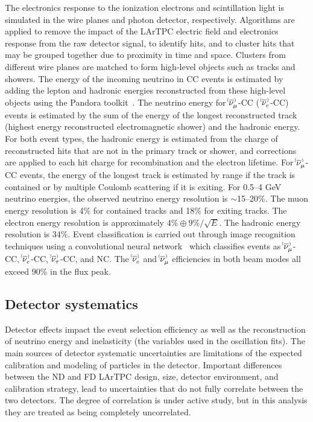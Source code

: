 The electronics response to the ionization electrons and scintillation light is simulated in the wire planes and photon detector, respectively. Algorithms are applied to remove the impact of the LArTPC electric field and electronics response from the raw detector signal, to identify hits, and to cluster hits that may be grouped together due to proximity in time and space. Clusters from different wire planes are matched to form high-level objects such as tracks and showers. The energy of the incoming neutrino in CC events is estimated by adding the lepton and hadronic energies reconstructed from these high-level objects using the Pandora toolkit~\cite{Marshall:2015rfa,Acciarri:2017hat}. The neutrino energy for $\nu^{\bracketbar}_{\mu}$-CC ($\;\nu^{\bracketbar}_{e}$-CC) events is estimated by the sum of the energy of the longest reconstructed track (highest energy reconstructed electromagnetic shower) and the hadronic energy. For both event types, the hadronic energy is estimated from the charge of reconstructed hits that are not in the primary track or shower, and corrections are applied to each hit charge for recombination and the electron lifetime. For $\nu^{\bracketbar}_{\mu}$-CC events, the energy of the longest track is estimated by range if the track is contained or by multiple Coulomb scattering if it is exiting. For 0.5--4 GeV neutrino energies, the observed neutrino energy resolution is $\sim$15--20\%. The muon energy resolution is 4\% for contained tracks and 18\% for exiting tracks. The electron energy resolution is approximately $4\% \oplus 9\%/\sqrt{E}$. The hadronic energy resolution is 34\%. Event classification is carried out through image recognition techniques using a convolutional neural network~\cite{cvn_paper} which classifies events as $\nu^{\bracketbar}_{\mu}$-CC, $\nu^{\bracketbar}_{e}$-CC, $\nu^{\bracketbar}_{\tau}$-CC, and NC. The $\nue^{\bracketbar}$ and $\numu^{\bracketbar}$ efficiencies in both beam modes all exceed 90\% in the flux peak.

\subsection{Detector systematics}
Detector effects impact the event selection efficiency as well as the reconstruction of neutrino energy and inelasticity (the variables used in the oscillation fits). The main sources of detector systematic uncertainties are limitations of the expected calibration and modeling of particles in the detector. Important differences between the ND and FD LArTPC design, size, detector environment, and calibration strategy, lead to uncertainties that do not fully correlate between the two detectors. The degree of correlation is under active study, but in this analysis they are treated as being completely uncorrelated.

